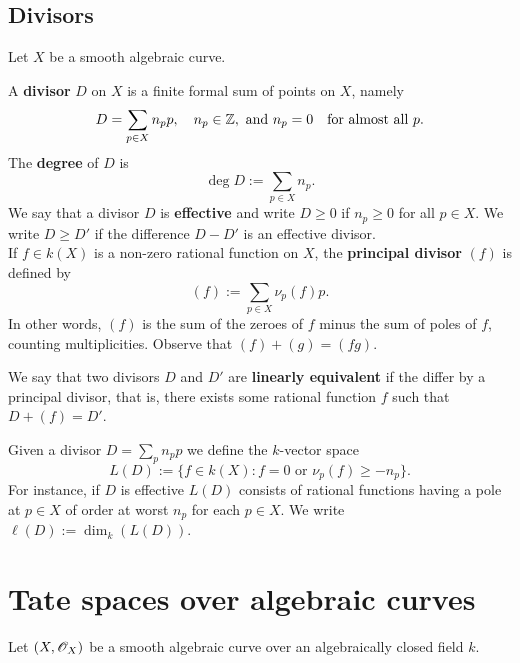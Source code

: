 \subsection{Divisors}
Let $X$ be a smooth algebraic curve. 
\begin{definition}\label{def:divisors}
	A \textbf{divisor} $D$ on $X$ is a finite formal sum of points on $X$, namely
	\[
		D = \sum_{p\in X} n_{p}p, \quad n_{p}\in {\mathbb Z},\text{ and }n_{p} = 0 \quad\text{for almost all } p.
	\]
	The \textbf{degree} of $D$ is
	\[
		\deg D := \sum_{p\in X}n_{p}.
	\]
	We say that a divisor $D$ is \textbf{effective} and write $D\geq 0$ if $n_{p}\geq 0$ for all $p\in X$. We write $D\geq D'$ if the difference $D - D'$ is an effective divisor. \\
	If $f\in k(X)$ is a non-zero rational function on $X$, the \textbf{principal divisor} $(f)$ is defined by
	\[
		(f):=\sum_{p\in X}\nu_{p}(f)p.
	\]
	In other words, $(f)$ is the sum of the zeroes of $f$ minus the sum of poles of $f$, counting multiplicities. Observe that $(f) + (g) = (fg)$. 

	We say that two divisors $D$ and $D'$ are \textbf{linearly equivalent} if the differ by a principal divisor, that is, there exists some rational function $f$ such that $D + (f) = D'$.

	Given a divisor $D = \sum_{p}n_{p}p$ we define the $k$-vector space
	\[
		L(D) := \{f\in k(X)\colon f = 0\text{ or } \nu_{p}(f) \geq -n_{p}\}.
	\]
	For instance, if $D$ is effective $L(D)$ consists of rational functions having a pole at $p\in X$ of order at worst $n_{p}$ for each $p\in X$. We write $\ell(D) := \dim_{k}(L(D))$.
\end{definition}
	

\section{Tate spaces over algebraic curves}
Let $(X,{\mathscr O}_{X})$ be a smooth algebraic curve over an algebraically closed field $k$.
